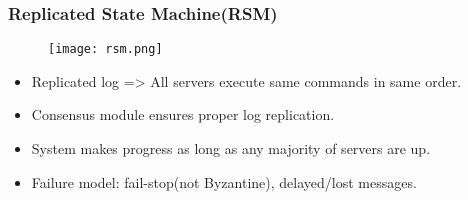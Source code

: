 \begin{frame}
    \frametitle{Replicated State Machine(RSM)}
    \begin{figure}
       \centering
        \texttt{[image: rsm.png]}
    \end{figure}

    \begin{itemize}
        \item Replicated log => \alert{All servers execute same commands in same order}.
        \item Consensus module ensures proper log replication.
        \item System makes progress as long as any majority of servers are up.
        \item Failure model: fail-stop(not Byzantine), delayed/lost messages.
    \end{itemize}
\end{frame}



%
